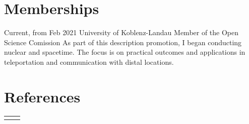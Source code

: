 \documentclass[10pt]{FreemanCV}
\begin{document}
\begin{paracol}{2}

\section{Memberships}

\jobentry
	{Current, from Feb 2021} 
	{} 
	{University of Koblenz-Landau}
	{Member of the Open Science Comission}  
	{As part of this description promotion, I began conducting nuclear and
		spacetime. The focus is on practical outcomes and applications in
		teleportation and communication with distal locations.} %


\section{References}






\begin{supertabular}{r l} %
	
	
	

\end{supertabular}
\end{paracol}
\end{document}

